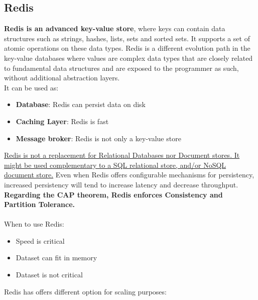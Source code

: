 \documentclass[10pt,a4paper]{article}
\newcommand{\nline}{\\~\\}
\begin{document}
\subsection{Redis}
\textbf{Redis is an advanced key-value store}, where keys can contain data structures such as strings, hashes, lists, sets and sorted sets. It supports a set of atomic operations on these data types. Redis is a different evolution path in the key-value databases where values are complex data types that are closely related to fundamental data structures and are exposed to the programmer as such, without additional abstraction layers. \\
It can be used as:
\begin{itemize}
	\item \textbf{Database}: Redis can persist data on disk
	\item \textbf{Caching Layer}: Redis is fast
	\item \textbf{Message broker}: Redis is not only a key-value store
\end{itemize}
\uline{Redis is not a replacement for Relational Databases nor Document stores. It might be used complementary to a SQL relational store, and/or NoSQL document store.} Even when Redis offers configurable mechanisms for persistency, increased persistency will tend to increase latency and decrease throughput.
\textbf{Regarding the CAP theorem, Redis enforces Consistency and Partition Tolerance.}
\nline
When to use Redis:
\begin{itemize}
	\item Speed is critical
	\item Dataset can fit in memory
	\item Dataset is not critical
\end{itemize}
Redis has offers different option for scaling purposes:
\end{document}
